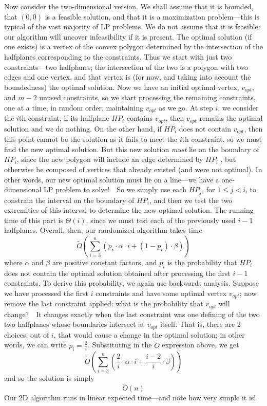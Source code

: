 \documentclass[11pt]{article}
\begin{document}
Now consider the two-dimensional version.  We shall assume that it is
bounded, that $(0,0)$ is a feasible solution, and that it is a maximization
problem---this is typical of the vast majority of LP problems.  We do not
assume that it is feasible: our algorithm will uncover infeasibility if it is
present.  The optimal solution (if one exists) is a vertex of the convex
polygon determined by the intersection of the halfplanes corresponding
to the constraints.  Thus we start with just two constraints---two halfplanes;
the intersection of the two is a polygon with two edges and one vertex, and that
vertex is (for now, and taking into account the boundedness) the optimal
solution.  Now we have an initial optimal vertex, $v_{opt}$, and $m-2$
unused constraints, so we start processing the remaining constraints,
one at a time, in random order, maintaining $v_{opt}$ as we go.  At step $i$,
we consider the $i$th constraint; if its halfplane $HP_i$ contains $v_{opt}$,
then $v_{opt}$ remains the optimal solution and we do nothing.  On the other
hand, if $HP_i$ does not contain $v_{opt}$, then this point cannot be the
solution as it fails to meet the $i$th constraint, so we must find the new
optimal solution.  But this new solution \emph{must} lie on the boundary of
$HP_i$, since the new polygon will include an edge determined by $HP_i$ ,
but otherwise be composed of vertices that already existed (and were not
optimal).  In other words, our new optimal solution must lie on a line---we
have a one-dimensional LP problem to solve!\ \ So we simply use each
$HP_j$, for $1\leq j<i$, to constrain the interval on the boundary of $HP_i$,
and then we test the two extremities of this interval to determine the new
optimal solution.  The running time of this part is $\Theta(i)$, since we
must test each of the previously used $i-1$ halfplanes.  Overall, then, our
randomized algorithm takes time
 $$\tilde{O}(\sum_{i=3}^n (p_i\cdot \alpha\cdot i + (1-p_i)\cdot\beta))$$
where $\alpha$ and $\beta$ are positive constant factors, and $p_i$ is
the probability that $HP_i$ does not contain the optimal solution obtained
after processing the first $i-1$ constraints.  To derive this probability,
we again use backwards analysis.  Suppose we have processed the first $i$
constraints and have some optimal vertex $v_{opt}$; now remove the last
constraint applied: what is the probability that $v_{opt}$ will change?\ \ 
It changes exactly when the last constraint was one defining of the two
two halfplanes whose boundaries intersect at $v_{opt}$ itself.  That is,
there are 2 choices, out of $i$, that would cause a change in the optimal
solution; in other words, we can write $p_i=\frac{2}{i}$.  Substituting
in the $\tilde{O}$ expression above, we get
 $$\tilde{O}(\sum_{i=3}^n (\frac{2}{i}\cdot \alpha\cdot i + \frac{i-2}{i}\cdot\beta))$$
and so the solution is simply
 $$\tilde{O}(n)$$
Our 2D algorithm runs in linear expected time---and note how very simple it is!
\end{document}
